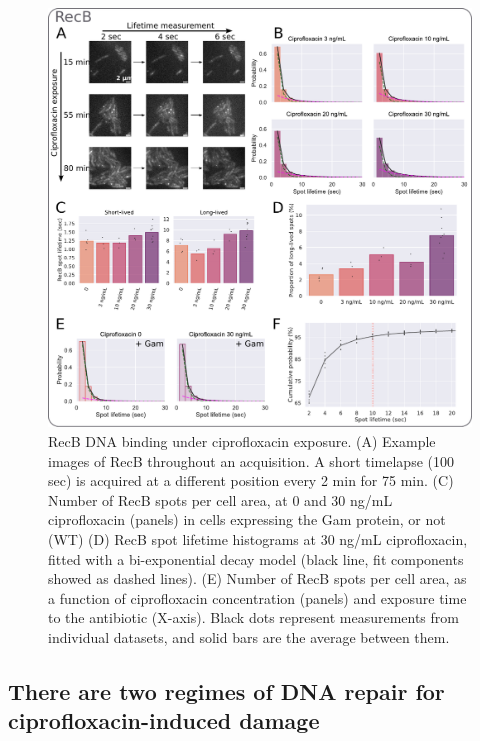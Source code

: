 \begin{figure}[htbp]
\begin{center}
\includegraphics[width=\textwidth]{Figures/Fig2_cipro_nSpots.pdf}
\end{center}
\caption{RecB DNA binding under ciprofloxacin exposure. (A) Example images of RecB throughout an acquisition. A short timelapse (100 sec) is acquired at a different position every 2 min for 75 min. (C) Number of RecB spots per cell area, at 0 and 30 ng/mL ciprofloxacin (panels) in cells expressing the Gam protein, or not (WT) (D) RecB spot lifetime histograms at 30 ng/mL ciprofloxacin, fitted with a bi-exponential decay model (black line, fit components showed as dashed lines). (E) Number of RecB spots per cell area, as a function of ciprofloxacin concentration (panels) and exposure time to the antibiotic (X-axis). Black dots represent measurements from individual datasets, and solid bars are the average between them.}
\label{Fig:nspots}
\end{figure}


\subsection*{There are two regimes of DNA repair for ciprofloxacin-induced damage}

